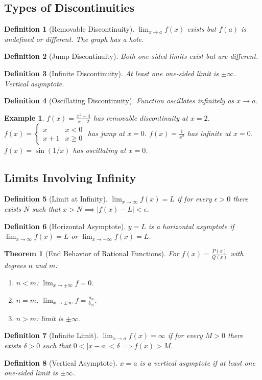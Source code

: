 \documentclass[11pt,a4paper]{article}
\newtheorem{example}{Example}
\newtheorem{theorem}{Theorem}
\newtheorem{definition}{Definition}
\begin{document}
\subsection{Types of Discontinuities}
\begin{definition}[Removable Discontinuity]
$\lim_{x \to a} f(x)$ exists but $f(a)$ is undefined or different. The graph has a hole.
\end{definition}
\begin{definition}[Jump Discontinuity]
Both one-sided limits exist but are different.
\end{definition}
\begin{definition}[Infinite Discontinuity]
At least one one-sided limit is $\pm\infty$. Vertical asymptote.
\end{definition}
\begin{definition}[Oscillating Discontinuity]
Function oscillates infinitely as $x \to a$.
\end{definition}
\begin{example}
$f(x) = \frac{x^2-4}{x-2}$ has removable discontinuity at $x=2$. $f(x) = \begin{cases} x & x<0 \\ x+1 & x \geq 0 \end{cases}$ has jump at $x=0$. $f(x) = \frac{1}{x^2}$ has infinite at $x=0$. $f(x) = \sin(1/x)$ has oscillating at $x=0$.
\end{example}
\subsection{Limits Involving Infinity}
\begin{definition}[Limit at Infinity]
$\lim_{x \to \infty} f(x) = L$ if for every $\epsilon > 0$ there exists $N$ such that $x > N \implies |f(x) - L| < \epsilon$.
\end{definition}
\begin{definition}[Horizontal Asymptote]
$y = L$ is a horizontal asymptote if $\lim_{x \to \infty} f(x) = L$ or $\lim_{x \to -\infty} f(x) = L$.
\end{definition}
\begin{theorem}[End Behavior of Rational Functions]
For $f(x) = \frac{P(x)}{Q(x)}$ with degrees $n$ and $m$:
\begin{enumerate}
\item $n < m$: $\lim_{x \to \pm\infty} f = 0$.
\item $n = m$: $\lim_{x \to \pm\infty} f = \frac{a_n}{b_m}$.
\item $n > m$: limit is $\pm\infty$.
\end{enumerate}
\end{theorem}
\begin{definition}[Infinite Limit]
$\lim_{x \to a} f(x) = \infty$ if for every $M > 0$ there exists $\delta > 0$ such that $0 < |x-a| < \delta \implies f(x) > M$.
\end{definition}
\begin{definition}[Vertical Asymptote]
$x = a$ is a vertical asymptote if at least one one-sided limit is $\pm\infty$.
\end{definition}
\end{document}
